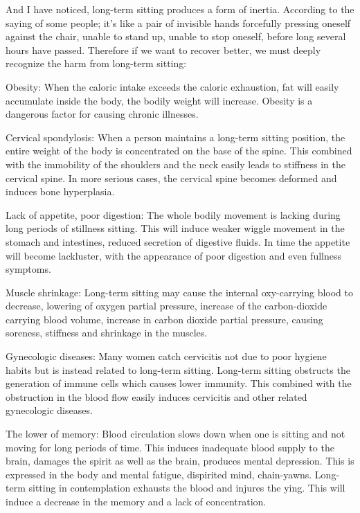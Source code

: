 \documentclass[
]{book}
\begin{document}
And I have noticed, long-term sitting produces a form of inertia. According to the saying of some people; it's like a pair of invisible hands forcefully pressing oneself against the chair, unable to stand up, unable to stop oneself, before long several hours have passed. Therefore if we want to recover better, we must deeply recognize the harm from long-term sitting:

Obesity: When the caloric intake exceeds the caloric exhaustion, fat will easily accumulate inside the body, the bodily weight will increase. Obesity is a dangerous factor for causing chronic illnesses.

Cervical spondylosis: When a person maintains a long-term sitting position, the entire weight of the body is concentrated on the base of the spine. This combined with the immobility of the shoulders and the neck easily leads to stiffness in the cervical spine. In more serious cases, the cervical spine becomes deformed and induces bone hyperplasia.

Lack of appetite, poor digestion: The whole bodily movement is lacking during long periods of stillness sitting. This will induce weaker wiggle movement in the stomach and intestines, reduced secretion of digestive fluids. In time the appetite will become lackluster, with the appearance of poor digestion and even fullness symptoms.

Muscle shrinkage: Long-term sitting may cause the internal oxy-carrying blood to decrease, lowering of oxygen partial pressure, increase of the carbon-dioxide carrying blood volume, increase in carbon dioxide partial pressure, causing soreness, stiffness and shrinkage in the muscles.

Gynecologic diseases: Many women catch cervicitis not due to poor hygiene habits but is instead related to long-term sitting. Long-term sitting obstructs the generation of immune cells which causes lower immunity. This combined with the obstruction in the blood flow easily induces cervicitis and other related gynecologic diseases.

The lower of memory: Blood circulation slows down when one is sitting and not moving for long periods of time. This induces inadequate blood supply to the brain, damages the spirit as well as the brain, produces mental depression. This is expressed in the body and mental fatigue, dispirited mind, chain-yawns. Long-term sitting in contemplation exhausts the blood and injures the ying. This will induce a decrease in the memory and a lack of concentration.
\end{document}
